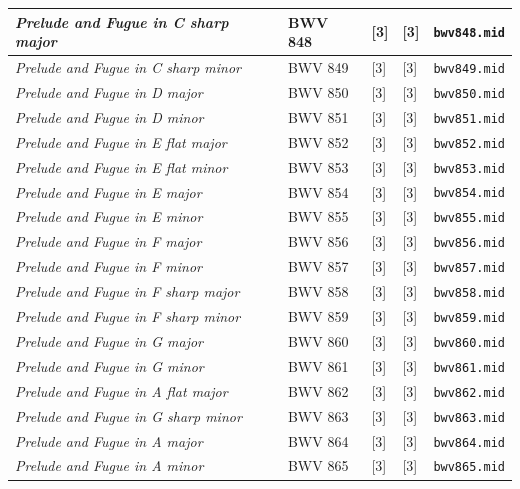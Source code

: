 \documentclass[a4paper, 11pt, twoside]{report}
\theoremstyle{definition}
\begin{document}
\begin{longtable}{ |S{0.37\textwidth}|P{0.12\textwidth}|P{0.09\textwidth}|P{0.09\textwidth}|S{0.21\textwidth}| }
\textit{Prelude and Fugue in C sharp major} 						& BWV 848	& [3] 	& [3] 	& \texttt{bwv848.mid} 			\\ \hline
\textit{Prelude and Fugue in C sharp minor} 						& BWV 849	& [3] 	& [3] 	& \texttt{bwv849.mid} 			\\ \hline
\textit{Prelude and Fugue in D major} 								& BWV 850	& [3] 	& [3] 	& \texttt{bwv850.mid} 			\\ \hline
\textit{Prelude and Fugue in D minor} 								& BWV 851	& [3] 	& [3] 	& \texttt{bwv851.mid} 			\\ \hline
\textit{Prelude and Fugue in E flat major} 							& BWV 852	& [3] 	& [3] 	& \texttt{bwv852.mid} 			\\ \hline
\textit{Prelude and Fugue in E flat minor} 							& BWV 853	& [3] 	& [3] 	& \texttt{bwv853.mid} 			\\ \hline
\textit{Prelude and Fugue in E major} 								& BWV 854	& [3] 	& [3] 	& \texttt{bwv854.mid} 			\\ \hline
\textit{Prelude and Fugue in E minor} 								& BWV 855	& [3] 	& [3] 	& \texttt{bwv855.mid} 			\\ \hline
\textit{Prelude and Fugue in F major} 								& BWV 856	& [3] 	& [3] 	& \texttt{bwv856.mid} 			\\ \hline
\textit{Prelude and Fugue in F minor} 								& BWV 857	& [3] 	& [3] 	& \texttt{bwv857.mid} 			\\ \hline
\textit{Prelude and Fugue in F sharp major} 						& BWV 858	& [3] 	& [3] 	& \texttt{bwv858.mid} 			\\ \hline
\textit{Prelude and Fugue in F sharp minor} 						& BWV 859	& [3] 	& [3] 	& \texttt{bwv859.mid} 			\\ \hline
\textit{Prelude and Fugue in G major} 								& BWV 860	& [3] 	& [3] 	& \texttt{bwv860.mid} 			\\ \hline
\textit{Prelude and Fugue in G minor} 								& BWV 861	& [3] 	& [3] 	& \texttt{bwv861.mid} 			\\ \hline
\textit{Prelude and Fugue in A flat major} 							& BWV 862	& [3] 	& [3] 	& \texttt{bwv862.mid} 			\\ \hline
\textit{Prelude and Fugue in G sharp minor} 						& BWV 863	& [3] 	& [3] 	& \texttt{bwv863.mid} 			\\ \hline
\textit{Prelude and Fugue in A major} 								& BWV 864	& [3] 	& [3] 	& \texttt{bwv864.mid} 			\\ \hline
\textit{Prelude and Fugue in A minor} 								& BWV 865	& [3] 	& [3] 	& \texttt{bwv865.mid} 			\\ \hline

\end{longtable}
\end{document}
